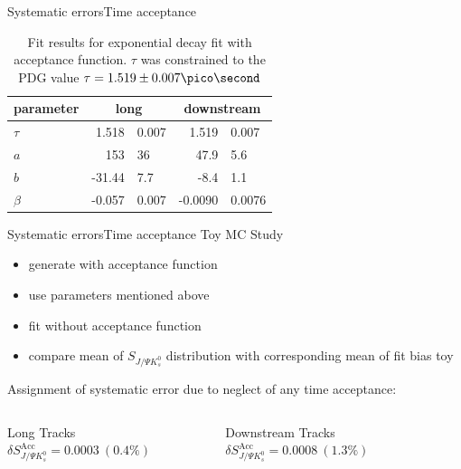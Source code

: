 \documentclass{beamer}
\newcommand{\SJPsi}{S_{J/\Psi K_s^0}}
\begin{document}
\begin{frame}{Systematic errors}{Time acceptance}
\begin{table}
\caption{Fit results for exponential decay fit with acceptance function. $\tau$ was constrained to the PDG value $\tau = 1.519 \pm 0.007 \pico\second$}
\begin{tabular}{lr@{$\pm$}l r@{$\pm$}l}
\hline \hline 
parameter & \multicolumn{2}{c}{long} & \multicolumn{2}{c}{downstream} \\ \hline
$\tau$    & 1.518 & 0.007 & 1.519 & 0.007 \\
$a$       & 153 & 36 & 47.9 & 5.6 \\
$b$       & -31.44 & 7.7 & -8.4 & 1.1 \\
$\beta$   & -0.057 & 0.007 &  -0.0090 & 0.0076 \\ 
\hline \hline
\end{tabular}
\end{table}
\end{frame}

\begin{frame}{Systematic errors}{Time acceptance}
Toy MC Study
\begin{itemize}
\item generate with acceptance function 
\item use parameters mentioned above
\item fit without acceptance function
\item compare mean of $\SJPsi$ distribution with corresponding mean of fit bias toy
\end{itemize}

Assignment of systematic error due to neglect of any time acceptance:
	\begin{columns}
	\begin{block}{Long Tracks}
    \centering
        $\delta\SJPsi^{\text{Acc}} = 0.0003\ (0.4\%)$
    \end{block}
	\begin{block}{Downstream Tracks}
    \centering
        $\delta\SJPsi^{\text{Acc}} = 0.0008\ (1.3\%)$
    \end{block}
    \end{columns}


\end{frame}
\end{document}
